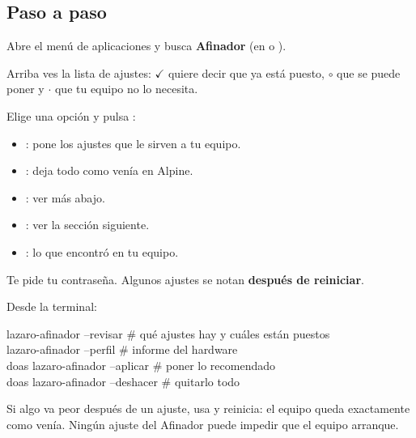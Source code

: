 \subsection{Paso a paso}
\begin{pasos}
  \item Abre el menú de aplicaciones y busca \textbf{Afinador} (en
         o ).
  \item Arriba ves la lista de ajustes: $\checkmark$ quiere decir que ya está
        puesto, $\circ$ que se puede poner y $\cdot$ que tu equipo no
        lo necesita.
  \item Elige una opción y pulsa :
    \begin{itemize}
      \item {}: pone los ajustes que le sirven a
            tu equipo.
      \item {}: deja todo como venía en Alpine.
      \item {}: ver más abajo.
      \item {}: ver la sección siguiente.
      \item {}: lo que encontró en tu
            equipo.
    \end{itemize}
  \item Te pide tu contraseña. Algunos ajustes se notan \textbf{después de
        reiniciar}.
\end{pasos}


Desde la terminal:
\begin{terminal}
lazaro-afinador --revisar          \# qué ajustes hay y cuáles están puestos\\
lazaro-afinador --perfil           \# informe del hardware\\
doas lazaro-afinador --aplicar     \# poner lo recomendado\\
doas lazaro-afinador --deshacer    \# quitarlo todo
\end{terminal}

\begin{consejo}
Si algo va peor después de un ajuste, usa  y
reinicia: el equipo queda exactamente como venía. Ningún ajuste del
Afinador puede impedir que el equipo arranque.
\end{consejo}

